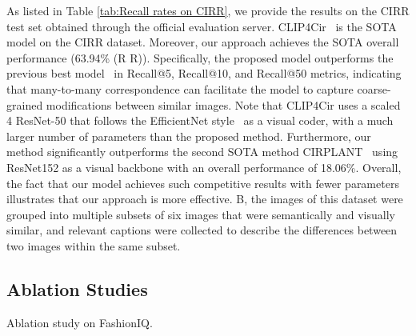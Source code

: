 \documentclass[letterpaper]{article} \usepackage{aaai24}  \usepackage{times}  \usepackage{helvet}  \usepackage{courier}  \usepackage[hyphens]{url}  \usepackage{graphicx} \urlstyle{rm} \def\UrlFont{\rm}  \usepackage{natbib}  \usepackage{caption} \frenchspacing  \setlength{\pdfpagewidth}{8.5in} \setlength{\pdfpageheight}{11in} \usepackage{amsmath,amsfonts}
\begin{document}
As listed in Table \ref{tab:Recall rates on CIRR}, we provide the results on the CIRR test set obtained through the official evaluation server. CLIP4Cir~\cite{Baldrati2022combiner} is the SOTA model on the CIRR dataset.
Moreover, our approach achieves the SOTA overall performance (63.94\% (R  R)). Specifically, the proposed model outperforms the previous best model~\cite{Baldrati2022combiner} in Recall@5, Recall@10, and Recall@50 metrics, indicating that many-to-many correspondence can facilitate the model to capture coarse-grained modifications between similar images. Note that CLIP4Cir uses a scaled 4  ResNet-50 that follows the EfficientNet style~\cite{Tan2019icml} as a visual coder, with a much larger number of parameters than the proposed method. Furthermore, our method significantly outperforms the second SOTA method CIRPLANT~\cite{liu2021image} using ResNet152 as a visual backbone with an overall performance of 18.06\%. Overall, the fact that our model achieves such competitive results with fewer parameters illustrates that our approach is more effective. B, the images of this dataset were grouped into multiple subsets of six images that were semantically and visually similar, and relevant captions were collected to describe the differences between two images within the same subset.

\subsection{Ablation Studies}

\begin{threeparttable}
    \centering
    \caption{Ablation study on FashionIQ. }
    \label{tab:Ablation}
\end{threeparttable}
\end{document}
